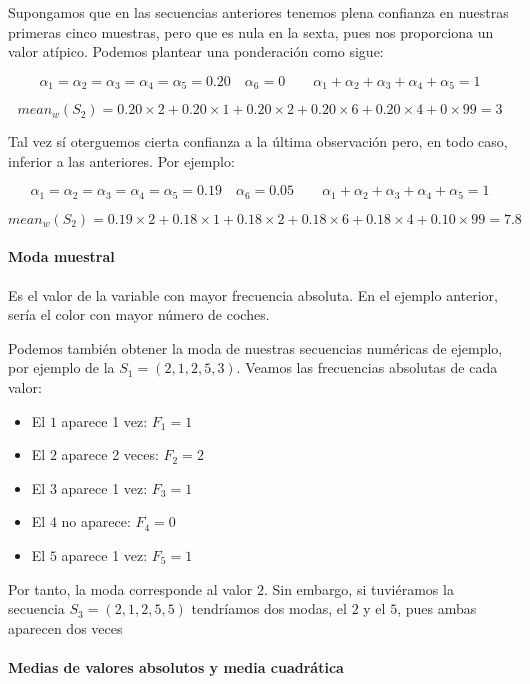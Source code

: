 \documentclass[11pt]{article}
\providecommand{\tightlist}{%
      \setlength{\itemsep}{0pt}\setlength{\parskip}{0pt}}
\begin{document}
    Supongamos que en las secuencias anteriores tenemos plena confianza en
nuestras primeras cinco muestras, pero que es nula en la sexta, pues nos
proporciona un valor atípico. Podemos plantear una ponderación como
sigue:

\[\alpha_1=\alpha_2=\alpha_3=\alpha_4 = \alpha_5 = 0.20 \quad \alpha_6=0 \qquad \alpha_1+\alpha_2+\alpha_3+\alpha_4+\alpha_5=1\]

\[mean_w(S_2) = 0.20 \times 2 + 0.20 \times 1 + 0.20 \times 2 + 0.20 \times 6+ 0.20 \times 4 + 0 \times 99= 3\]

Tal vez sí oterguemos cierta confianza a la última observación pero, en
todo caso, inferior a las anteriores. Por ejemplo:

\[\alpha_1 = \alpha_2 = \alpha_3 = \alpha_4 = \alpha_5 = 0.19 \quad \alpha_6=0.05 \qquad \alpha_1+\alpha_2+\alpha_3+\alpha_4+\alpha_5=1\]

\[mean_w(S_2) = 0.19 \times 2 + 0.18 \times 1 + 0.18 \times 2 + 0.18 \times 6+ 0.18 \times 4 + 0.10 \times 99= 7.8\]


    \paragraph{Moda muestral}\label{moda-muestral}

Es el valor de la variable con mayor frecuencia absoluta. En el ejemplo
anterior, sería el color con mayor número de coches.

Podemos también obtener la moda de nuestras secuencias numéricas de
ejemplo, por ejemplo de la \(S_1 = (2, 1, 2, 5, 3)\). Veamos las
frecuencias absolutas de cada valor:

\begin{itemize}
\tightlist
\item
  El \(1\) aparece 1 vez: \(F_1 = 1\)
\item
  El \(2\) aparece 2 veces: \(F_2 = 2\)
\item
  El \(3\) aparece 1 vez: \(F_3 = 1\)
\item
  El \(4\) no aparece: \(F_4 = 0\)
\item
  El \(5\) aparece 1 vez: \(F_5 = 1\)
\end{itemize}

Por tanto, la moda corresponde al valor \(2\). Sin embargo, si
tuviéramos la secuencia \(S_3 = (2, 1, 2, 5, 5)\) tendríamos dos modas,
el \(2\) y el \(5\), pues ambas aparecen dos veces


    \paragraph{Medias de valores absolutos y media
cuadrática}\label{medias-de-valores-absolutos-y-media-cuadruxe1tica}
\end{document}
